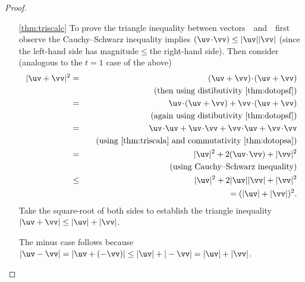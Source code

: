 \begin{proof}
\begin{itemize}
\item[\ref{thm:triscalc}]
To prove the triangle inequality between vectors~\uv\ and~\vv\ first observe the Cauchy--Schwarz inequality implies \((\uv\cdot\vv)\leq|\uv||\vv|\) (since the left-hand side has magnitude\({}\leq{}\)the right-hand side).
Then consider (analogous to the \(t=1\) case of the above)
%
\begin{eqnarray*}
|\uv+\vv|^2
&=&(\uv+\vv)\cdot(\uv+\vv)
\\&&\quad(\text{then using distibutivity~\ref{thm:dotopsf}})
\\&=&\uv\cdot(\uv+\vv)+\vv\cdot(\uv+\vv)
\\&&\quad(\text{again using distibutivity~\ref{thm:dotopsf}})
\\&=&\uv\cdot\uv+\uv\cdot\vv+\vv\cdot\uv+\vv\cdot\vv
\\&&\quad(\text{using~\ref{thm:triscala} and commutativity~\ref{thm:dotopsa}})
\\&=&|\uv|^2+2(\uv\cdot\vv)+|\vv|^2
\\&&\quad(\text{using Cauchy--Schwarz inequality})
\\&\leq&|\uv|^2+2|\uv||\vv|+|\vv|^2
\\&&{}=(|\uv|+|\vv|)^2.
\end{eqnarray*}
Take the square-root of both sides to establish the triangle inequality \(|\uv+\vv|\leq|\uv|+|\vv|\).

The minus case follows because \(|\uv-\vv|=|\uv+(-\vv)|\leq|\uv|+|-\vv|=|\uv|+|\vv|\).
%

\end{itemize}
\end{proof}


